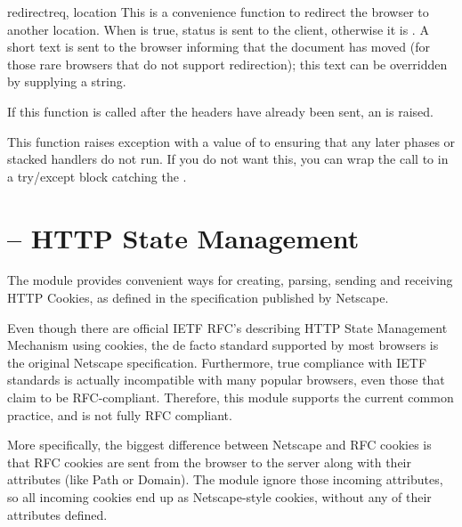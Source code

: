 \begin{funcdesc}{redirect}{req, location}
  This is a convenience function to redirect the browser to another
  location. When  is true, 
  status is sent to the client, otherwise it is
  . A short text is sent to the browser
  informing that the document has moved (for those rare browsers that
  do not support redirection); this text can be overridden by
  supplying a  string.

  If this function is called after the headers have already been sent,
  an  is raised.

  This function raises  exception with
  a value of  to ensuring that any later phases or
  stacked handlers do not run. If you do not want this, you can wrap the
  call to  in a try/except block catching the
  .
\end{funcdesc}

\section{ -- HTTP State Management\label{pyapi-cookie}}

The  module provides convenient ways for creating,
parsing, sending and receiving HTTP Cookies, as defined in the
specification published by Netscape.

\begin{notice}
  Even though there are official IETF RFC's describing HTTP State
  Management Mechanism using cookies, the de facto standard supported
  by most browsers is the original Netscape specification.
  Furthermore, true compliance with IETF standards is actually
  incompatible with many popular browsers, even those that claim to be
  RFC-compliant. Therefore, this module supports the current common
  practice, and is not fully RFC compliant.
  
  More specifically, the biggest difference between Netscape and RFC cookies is 
  that RFC cookies are sent from the browser to the server along with their 
  attributes (like Path or Domain). The  module ignore those 
  incoming attributes, so all incoming cookies end up as Netscape-style cookies, 
  without any of their attributes defined.
\end{notice}

